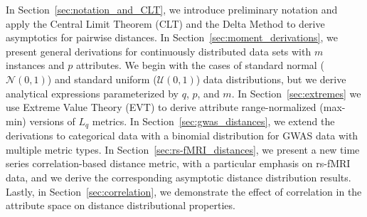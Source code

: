 \documentclass[aos]{imsart}
\begin{document}
In Section~\ref{sec:notation_and_CLT}, we introduce preliminary notation and apply the Central Limit Theorem (CLT) and the Delta Method to derive asymptotics for pairwise distances. In Section~\ref{sec:moment_derivations}, we present general derivations for continuously distributed data sets with $m$ instances and $p$ attributes. We begin with the cases of standard normal ($\mathcal{N}(0,1)$) and standard uniform ($\mathcal{U}(0,1)$) data distributions, but we derive analytical expressions parameterized by $q$, $p$, and $m$. In Section~\ref{sec:extremes} we use Extreme Value Theory (EVT) to derive attribute range-normalized (max-min) versions of $L_q$ metrics. In Section~\ref{sec:gwas_distances}, we extend the derivations to categorical data with a binomial distribution for GWAS data with multiple metric types. In Section~\ref{sec:rs-fMRI_distances}, we present a new time series correlation-based distance metric, with a particular emphasis on rs-fMRI data, and we derive the corresponding asymptotic distance distribution results. Lastly, in Section~\ref{sec:correlation}, we demonstrate the effect of correlation in the attribute space on distance distributional properties. 
\end{document}
